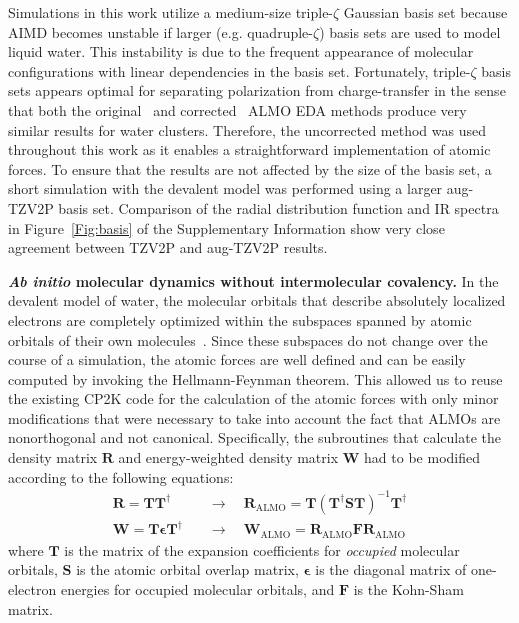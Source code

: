 \documentclass[aps,prl,reprint,amsmath,amssymb]{revtex4-1}
\begin{document}
Simulations in this work utilize a medium-size triple-$\zeta$ Gaussian basis set because AIMD becomes unstable if larger (e.g. quadruple-$\zeta$) basis sets are used to model liquid water. 
This instability is due to the frequent appearance of molecular configurations with linear dependencies in the basis set. 
Fortunately, triple-$\zeta$ basis sets appears optimal for separating polarization from charge-transfer in the sense that both the original~\cite{khaliullin2007unravelling} and corrected~\cite{horn2015polarization} ALMO EDA methods produce very similar results for water clusters. 
Therefore, the uncorrected method was used throughout this work as it enables a straightforward implementation of atomic forces. 
To ensure that the results are not affected by the size of the basis set, a short simulation with the devalent model was performed using a larger aug-TZV2P basis set. Comparison of the radial distribution function and IR spectra in Figure~\ref{Fig:basis} of the Supplementary Information show very close agreement between TZV2P and aug-TZV2P results. 


\textbf{\textit{Ab initio} molecular dynamics without intermolecular covalency.} In the devalent model of water, the molecular orbitals that describe absolutely localized electrons are completely optimized within the subspaces spanned by atomic orbitals of their own molecules~\cite{khaliullin2006efficient}. Since these subspaces do not change over the course of a simulation, the atomic forces are well defined and can be easily computed by invoking the Hellmann-Feynman theorem. This allowed us to reuse the existing CP2K code for the calculation of the atomic forces with only minor modifications that were necessary to take into account the fact that ALMOs are nonorthogonal and not canonical. Specifically, the subroutines that calculate the density matrix $\mathbf{R}$ and  energy-weighted density matrix $\mathbf{W}$ had to be modified according to the following equations:
%
\begin{equation}
\begin{split}
\mathbf{R} = \mathbf{T} \mathbf{T}^{\dagger} \quad &\rightarrow \quad \mathbf{R}_{\text{ALMO}} = \mathbf{T} (\mathbf{T}^{\dagger} \mathbf{S} \mathbf{T})^{-1}\mathbf{T}^{\dagger} \\
\mathbf{W} = \mathbf{T} \mathbf{\epsilon} \mathbf{T}^{\dagger} \quad &\rightarrow \quad \mathbf{W}_{\text{ALMO}}  = \mathbf{R}_{\text{ALMO}} \mathbf{F} \mathbf{R}_{\text{ALMO}}
\end{split}
\end{equation}
%
where $\mathbf{T}$ is the matrix of the expansion coefficients for \emph{occupied} molecular orbitals, $\mathbf{S}$ is the atomic orbital overlap matrix, $\mathbf{\epsilon}$ is the diagonal matrix of one-electron energies for occupied molecular orbitals, and $\mathbf{F}$ is the Kohn-Sham matrix.
\end{document}
